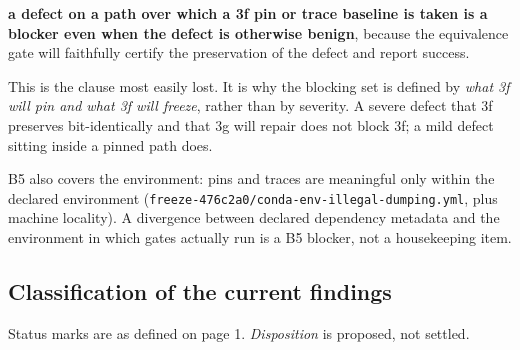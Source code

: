 \documentclass[11pt]{article}
\renewcommand{\tt}[1]{\texttt{#1}}
\newenvironment{ruling}{\begin{leftbar}\small}{\end{leftbar}}
\begin{document}
\begin{ruling}
\noindent\textbf{a defect on a path over which a 3f pin or trace baseline is taken is a
blocker even when the defect is otherwise benign}, because the equivalence gate will
faithfully certify the preservation of the defect and report success.
\end{ruling}

This is the clause most easily lost. It is why the blocking set is defined by
\emph{what 3f will pin and what 3f will freeze}, rather than by severity. A severe defect
that 3f preserves bit-identically and that 3g will repair does not block 3f; a mild defect
sitting inside a pinned path does.

B5 also covers the environment: pins and traces are meaningful only within the declared
environment (\tt{freeze-476c2a0/\allowbreak{}conda-env-illegal-dumping.yml}, plus machine
locality). A divergence between declared dependency metadata and the environment in which
gates actually run is a B5 blocker, not a housekeeping item.

\subsection{Classification of the current findings}

Status marks are as defined on page 1. \emph{Disposition} is proposed, not settled.
\end{document}
